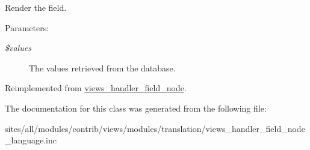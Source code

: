 Render the field.

\begin{Desc}
\item[Parameters:]
\begin{description}
\item[{\em \$values}]The values retrieved from the database. \end{description}
\end{Desc}


Reimplemented from \hyperlink{classviews__handler__field__node_fe7681e1188ad74ce9b604ad3ba864c0}{views\_\-handler\_\-field\_\-node}.

The documentation for this class was generated from the following file:\begin{CompactItemize}
\item 
sites/all/modules/contrib/views/modules/translation/views\_\-handler\_\-field\_\-node\_\-language.inc\end{CompactItemize}
